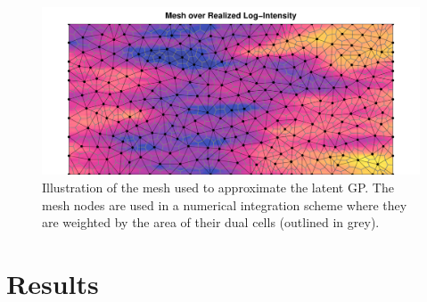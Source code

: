 \documentclass[review]{elsarticle}
\begin{document}
\begin{figure}
\includegraphics[width=5in]{../graphics/mesh-LGCP000004.pdf}
\caption{Illustration of the mesh used to approximate the latent GP. The mesh
nodes are used in a numerical integration scheme where they are weighted by the
area of their dual cells (outlined in grey).}
\label{meshfull}
\end{figure}




\section{Results}



\end{document}
